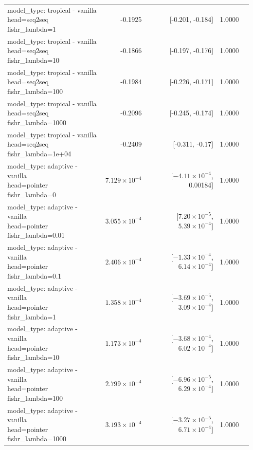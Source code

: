 \documentclass[10pt]{article}
\makeatletter
\newcommand{\stackcell}[1]{\begin{tabular}[t]{@{}l@{}}#1\end{tabular}}
\makeatother
\begin{document}
{\begin{longtable}{lrrrl}
\stackcell{model\_type: tropical - vanilla\\\footnotesize head=seq2seq fishr\_lambda=1 } & -0.1925 & [-0.201, -0.184] & 1.0000 & \\
\stackcell{model\_type: tropical - vanilla\\\footnotesize head=seq2seq fishr\_lambda=10 } & -0.1866 & [-0.197, -0.176] & 1.0000 & \\
\stackcell{model\_type: tropical - vanilla\\\footnotesize head=seq2seq fishr\_lambda=100 } & -0.1984 & [-0.226, -0.171] & 1.0000 & \\
\stackcell{model\_type: tropical - vanilla\\\footnotesize head=seq2seq fishr\_lambda=1000 } & -0.2096 & [-0.245, -0.174] & 1.0000 & \\
\stackcell{model\_type: tropical - vanilla\\\footnotesize head=seq2seq fishr\_lambda=1e+04 } & -0.2409 & [-0.311, -0.17] & 1.0000 & \\
\stackcell{model\_type: adaptive - vanilla\\\footnotesize head=pointer fishr\_lambda=0 } & $7.129\times10^{-4}$ & [$-4.11\times10^{-4}$, 0.00184] & 1.0000 & \\
\stackcell{model\_type: adaptive - vanilla\\\footnotesize head=pointer fishr\_lambda=0.01 } & $3.055\times10^{-4}$ & [$7.20\times10^{-5}$, $5.39\times10^{-4}$] & 1.0000 & \\
\stackcell{model\_type: adaptive - vanilla\\\footnotesize head=pointer fishr\_lambda=0.1 } & $2.406\times10^{-4}$ & [$-1.33\times10^{-4}$, $6.14\times10^{-4}$] & 1.0000 & \\
\stackcell{model\_type: adaptive - vanilla\\\footnotesize head=pointer fishr\_lambda=1 } & $1.358\times10^{-4}$ & [$-3.69\times10^{-5}$, $3.09\times10^{-4}$] & 1.0000 & \\
\stackcell{model\_type: adaptive - vanilla\\\footnotesize head=pointer fishr\_lambda=10 } & $1.173\times10^{-4}$ & [$-3.68\times10^{-4}$, $6.02\times10^{-4}$] & 1.0000 & \\
\stackcell{model\_type: adaptive - vanilla\\\footnotesize head=pointer fishr\_lambda=100 } & $2.799\times10^{-4}$ & [$-6.96\times10^{-5}$, $6.29\times10^{-4}$] & 1.0000 & \\
\stackcell{model\_type: adaptive - vanilla\\\footnotesize head=pointer fishr\_lambda=1000 } & $3.193\times10^{-4}$ & [$-3.27\times10^{-5}$, $6.71\times10^{-4}$] & 1.0000 & \\

\end{longtable}}
\end{document}
